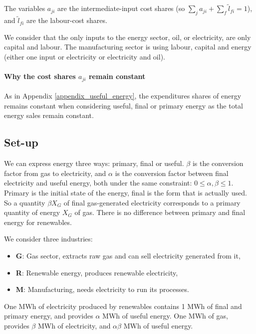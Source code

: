 \documentclass[11pt]{article}
\begin{document}
\noindent The variables $a_{ji}$ are the intermediate-input cost shares (so $\sum_j a_{ji} + \sum_f \tilde{l}_{fi}=1$), and $\tilde{l}_{fi}$ are the labour-cost shares.

We consider that the only inputs to the energy sector, oil, or electricity, are only capital and labour. The manufacturing sector is using labour, capital and energy (either one input or electricity or electricity and oil).

\tableofcontents


\paragraph{Why the cost shares $a_{ji}$ remain constant}

As in Appendix \ref{appendix_useful_energy}, the expenditures shares of energy remains constant when considering useful, final or primary energy as the total energy sales remain constant.

\subsection{Set-up}

We can express energy three ways: primary, final or useful. $\beta$ is the conversion factor from gas to electricity, and $\alpha$ is the conversion factor between final electricity and useful energy,  both under the same constraint: $0 \leq \alpha, \beta\leq 1$. Primary is the initial state of the energy, final is the form that is actually used. So a quantity $\beta X_G$ of final gas-generated electricity corresponds to a primary quantity of energy $X_G$ of gas. There is no difference between primary and final energy for renewables. 



We consider three industries:
\begin{itemize}
\item \textbf{G}: Gas sector, extracts raw gas and can sell electricity generated from it,
\item \textbf{R}: Renewable energy, produces renewable electricity,
\item \textbf{M}: Manufacturing, needs electricity to run its processes.
\end{itemize}


One MWh of electricity produced by renewables contains 1 MWh of final and primary energy, and provides $\alpha$ MWh of useful energy. One MWh of gas, provides $\beta$ MWh of electricity, and $\alpha\beta$ MWh of useful energy.
 
\end{document}
